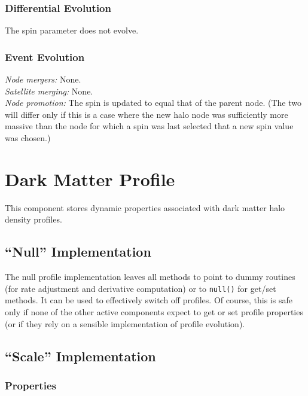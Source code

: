 \subsubsection{Differential Evolution}

The spin parameter does not evolve.

\subsubsection{Event Evolution}

\noindent\emph{Node mergers:} None.\\

\noindent\emph{Satellite merging:} None.\\

\noindent\emph{Node promotion:} The spin is updated to equal that of the parent node. (The two will differ only if this is a case where the new halo node was sufficiently more massive than the node for which a spin was last selected that a new spin value was chosen.)\\

\section{Dark Matter Profile}

This component stores dynamic properties associated with dark matter halo density profiles.

\subsection{``Null'' Implementation}

The null profile implementation leaves all methods to point to dummy routines (for rate adjustment and derivative computation) or to {\tt null()} for get/set methods. It can be used to effectively switch off profiles. Of course, this is safe only if none of the other active components expect to get or set profile properties (or if they rely on a sensible implementation of profile evolution).

\subsection{``Scale'' Implementation}

\subsubsection{Properties}

